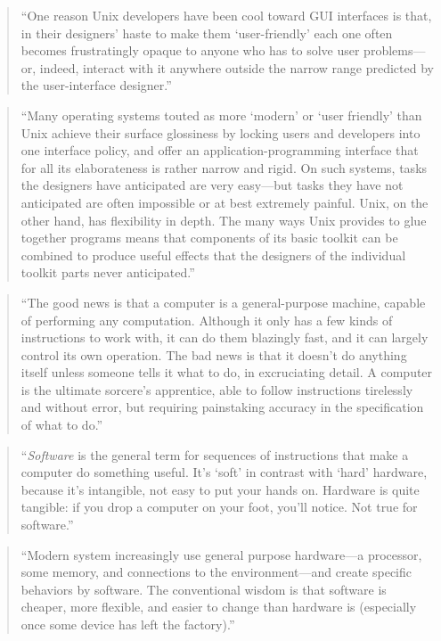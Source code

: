 \documentclass[]{tufte-book}
\begin{document}
\begin{quote}
``One reason Unix developers have been cool toward GUI interfaces is that, in their
designers' haste to make them `user-friendly' each one often becomes frustratingly
opaque to anyone who has to solve user problems---or, indeed, interact with it anywhere
outside the narrow range predicted by the user-interface designer.'' \citep{raymond2003art}
\end{quote}

\begin{quote}
``Many operating systems touted as more `modern' or `user friendly' than Unix achieve their
surface glossiness by locking users and developers into one interface policy, and offer an
application-programming interface that for all its elaborateness is rather narrow and rigid.
On such systems, tasks the designers have anticipated are very easy---but tasks they have
not anticipated are often impossible or at best extremely painful. Unix, on the other hand, has
flexibility in depth. The many ways Unix provides to glue together programs means that components
of its basic toolkit can be combined to produce useful effects that the designers of the individual
toolkit parts never anticipated.'' \citep{raymond2003art}
\end{quote}

\begin{quote}
``The good news is that a computer is a general-purpose machine, capable of performing
any computation. Although it only has a few kinds of instructions to work with, it can
do them blazingly fast, and it can largely control its own operation. The bad news is
that it doesn't do anything itself unless someone tells it what to do, in excruciating
detail. A computer is the ultimate sorcere's apprentice, able to follow instructions
tirelessly and without error, but requiring painstaking accuracy in the
specification of what to do.'' \citep{kernighan2011d}
\end{quote}

\begin{quote}
``\emph{Software} is the general term for sequences of instructions that make a computer
do something useful. It's `soft' in contrast with `hard' hardware, because it's
intangible, not easy to put your hands on. Hardware is quite tangible: if you drop
a computer on your foot, you'll notice. Not true for software.'' \citep{kernighan2011d}
\end{quote}

\begin{quote}
``Modern system increasingly use general purpose hardware---a processor, some memory,
and connections to the environment---and create specific behaviors by software. The
conventional wisdom is that software is cheaper, more flexible, and easier to change than
hardware is (especially once some device has left the factory).'' \citep{kernighan2011d}
\end{quote}
\end{document}
